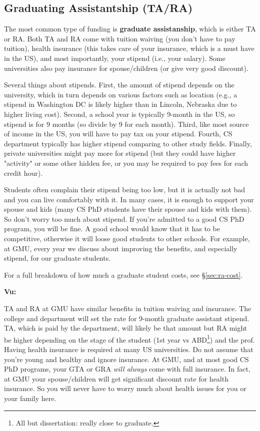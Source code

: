 \documentclass[11pt]{article}
\newenvironment{commentbox}[1][]{
\small
    \begin{cbox}
    \textbf{#1} 
 }{
   \end{cbox}
}
\begin{document}
\subsection{Graduating Assistantship (TA/RA)}
The most common type of funding is \textbf{graduate assistanship}, which is either TA or RA. Both TA and RA come with tuition waiving (you don't have to pay tuition), health insurance (this takes care of your insurance, which is a must have in the US), and most importantly, your stipend (i.e., your salary). Some universities also pay insurance for spouse/children (or give very good discount).

Several things about stipends.  First, the amount of stipend depends on the university, which in turn depends on various factors such as location (e.g., a stipend in Washington DC is likely higher than in Lincoln, Nebraska due to higher living cost). Second, a school year is typically 9-month in the US, so stipend is for 9 months (so divide by 9 for each month). Third, like most source of income in the US, you will have to pay tax on your stipend.  Fourth, CS department typically has higher stipend comparing to other study fields.  Finally, private universities might pay more for stipend (but they could have higher "activity" or some other hidden fee, or you may be required to pay fees for each credit hour).

Students often complain their stipend being too low, but it is actually not bad and you can live comfortably with it.  In many cases, it is enough to support your spouse and kids (many CS PhD students have their spouse and kids with them). So don't worry too much about stipend.  If you're admitted to a good CS PhD program, you will be fine. A good school would know that it has to be competitive, otherwise it will loose good students to other schools.  For example, at GMU, every year we discuss about improving the benefits, and especially stipend, for our graduate students. 

For a full breakdown of how much a graduate student costs, see \S\ref{sec:ra-cost}.

\begin{commentbox}[Vu:]
TA and RA at GMU have similar benefits in tuition waiving and insurance.  The college and department will set the rate for 9-month graduate assistant stipend.  TA, which is paid by the department, will likely be that amount but RA might be higher depending on the stage of the student (1st year vs ABD\footnote{All but dissertation: really close to graduate.}) and the prof. 
\tcblower
Having health insurance is required at many US universities.  Do not assume that you're young and healthy and ignore insurance.  At GMU, and at most good CS PhD programs, your GTA or GRA \emph{will always} come with full insurance. In fact, at GMU your spouse/children will get significant discount rate for health insurance.  So you will never have to worry much about health issues for you or your family here.
\end{commentbox}
\end{document}
